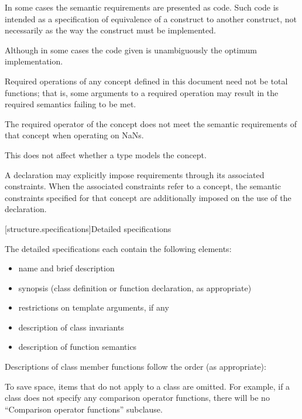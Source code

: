 \pnum
In some cases the semantic requirements are presented as \Cpp{} code.
Such code is intended as a
specification of equivalence of a construct to another construct, not
necessarily as the way the construct
must be implemented.
\begin{footnote}
Although in some cases the code given is
unambiguously the optimum implementation.
\end{footnote}

\pnum
Required operations of any concept defined in this document need not be
total functions; that is, some arguments to a required operation may
result in the required semantics failing to be met.
\begin{example}
The required \tcode{<} operator of the 
concept does not meet the
semantic requirements of that concept when operating on NaNs.
\end{example}
This does not affect whether a type models the concept.

\pnum
A declaration may explicitly impose requirements through its associated
constraints. When the associated constraints refer to a
concept, the semantic constraints specified for that concept
are additionally imposed on the use of the declaration.

[structure.specifications]{Detailed specifications}

\pnum
The detailed specifications each contain the following elements:%

\begin{itemize}
\item name and brief description
\item synopsis (class definition or function declaration, as appropriate)
\item restrictions on template arguments, if any
\item description of class invariants
\item description of function semantics
\end{itemize}

\pnum
Descriptions of class member functions follow the order (as
appropriate):
\begin{footnote}
To save space, items that do not apply to a class are omitted.
For example, if a class does not specify any comparison operator functions, there
will be no ``Comparison operator functions'' subclause.
\end{footnote}

